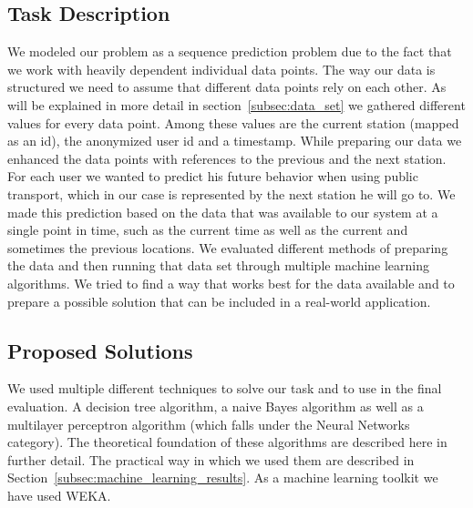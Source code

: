 \subsection{Task Description}
\label{subsec:task_description}
We modeled our problem as a sequence prediction problem due to the fact that we work with heavily dependent individual data points. The way our data is structured we need to assume that different data points rely on each other. As will be explained in more detail in section~\ref{subsec:data_set} we gathered different values for every data point. Among these values are the current station (mapped as an id), the anonymized user id and a timestamp. While preparing our data we enhanced the data points with references to the previous and the next station. For each user we wanted to predict his future behavior when using public transport, which in our case is represented by the next station he will go to. We made this prediction based on the data that was available to our system at a single point in time, such as the current time as well as the current and sometimes the previous locations. We evaluated different methods of preparing the data and then running that data set through multiple machine learning algorithms. We tried to find a way that works best for the data available and to prepare a possible solution that can be included in a real-world application.


\subsection{Proposed Solutions}
\label{subsec:proposed_solution}
We used multiple different techniques to solve our task and to use in the final evaluation. A decision tree algorithm, a naive Bayes algorithm as well as a multilayer perceptron algorithm (which falls under the Neural Networks category). The theoretical foundation of these algorithms are described here in further detail. The practical way in which we used them are described in Section~\ref{subsec:machine_learning_results}. As a machine learning toolkit we have used WEKA.

